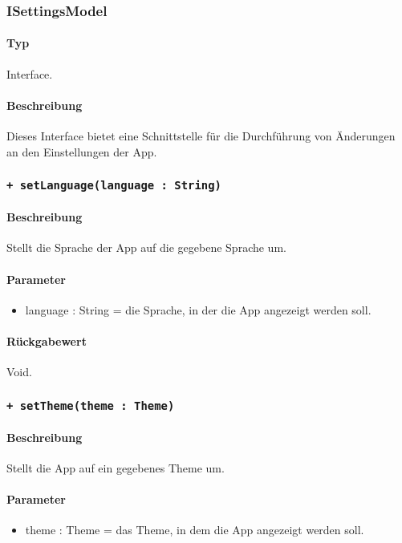 \subsubsection{ISettingsModel}
\paragraph*{Typ}
Interface.
\paragraph*{Beschreibung}
Dieses Interface bietet eine Schnittstelle für die Durchführung von Änderungen an den Einstellungen der App.

\subsubsection*{\texttt{+ setLanguage(language : String)}}%
\paragraph*{Beschreibung}
Stellt die Sprache der App auf die gegebene Sprache um.
\paragraph*{Parameter}
\begin{itemize}
    \item language : String = die Sprache, in der die App angezeigt werden soll.
\end{itemize}
\paragraph*{Rückgabewert}
Void.

\subsubsection*{\texttt{+ setTheme(theme : Theme)}}%
\paragraph*{Beschreibung}
Stellt die App auf ein gegebenes Theme um.
\paragraph*{Parameter}
\begin{itemize}
    \item theme : Theme = das Theme, in dem die App angezeigt werden soll.
\end{itemize}
